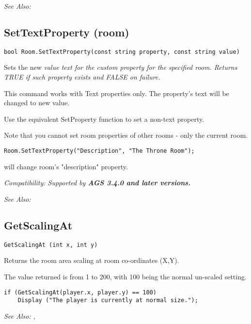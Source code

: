 \it{See Also:} 


\subsection{SetTextProperty (room)}\label{Room.SetTextProperty}%

\begin{verbatim}
bool Room.SetTextProperty(const string property, const string value)
\end{verbatim}
Sets the new \it{value} text for the custom \it{property} for the specified room. Returns
TRUE if such property exists and FALSE on failure.

This command works with Text properties only. The property's text will be
changed to new value.

Use the equivalent SetProperty function to set a non-text property.

Note that you cannot set room properties of other rooms - only the current room.

\begin{verbatim}
Room.SetTextProperty("Description", "The Throne Room");
\end{verbatim}
will change room's "description" property.

\it{Compatibility:} Supported by \bf{AGS 3.4.0} and later versions.

\it{See Also:} 


\subsection{GetScalingAt}\label{GetScalingAt}%

\begin{verbatim}
GetScalingAt (int x, int y)
\end{verbatim}
Returns the room area scaling at room co-ordinates (X,Y).

The value returned is from 1 to 200, with 100 being the normal un-scaled setting.

\begin{verbatim}
if (GetScalingAt(player.x, player.y) == 100)
    Display ("The player is currently at normal size.");
\end{verbatim}

\it{See Also:} , 



